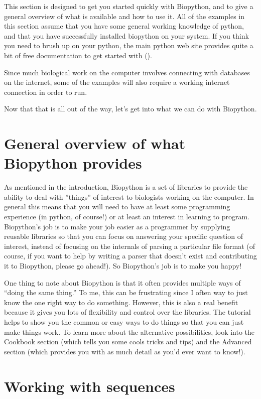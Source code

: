 \documentclass{report}
\begin{document}
This section is designed to get you started quickly with Biopython, and to give a general overview of what is available and how to use it. All of the examples in this section assume that you have some general working knowledge of python, and that you have successfully installed biopython on your system. If you think you need to brush up on your python, the main python web site provides quite a bit of free documentation to get started with (). 

 
Since much biological work on the computer involves connecting with databases on the internet, some of the examples will also require a working internet connection in order to run. 


Now that that is all out of the way, let's get into what we can do with Biopython.

\section{General overview of what Biopython provides}

As mentioned in the introduction, Biopython is a set of libraries to provide the ability to deal with ''things'' of interest to biologists working on the computer. In general this means that you will need to have at least some programming experience (in python, of course!) or at least an interest in learning to program. Biopython's job is to make your job easier as a programmer by supplying reusable libraries so that you can focus on answering your specific question of interest, instead of focusing on the internals of parsing a particular file format (of course, if you want to help by writing a parser that doesn't exist and contributing it to Biopython, please go ahead!). So Biopython's job is to make you happy!


One thing to note about Biopython is that it often provides multiple ways of ``doing the same thing.'' To me, this can be frustrating since I often way to just know the one right way to do something. However, this is also a real benefit because it gives you lots of flexibility and control over the libraries. The tutorial helps to show you the common or easy ways to do things so that you can just make things work. To learn more about the alternative possibilities, look into the Cookbook section (which tells you some cools tricks and tips) and the Advanced section (which provides you with as much detail as you'd ever want to know!). 

\section{Working with sequences}
\label{sec:sequences}
\end{document}
